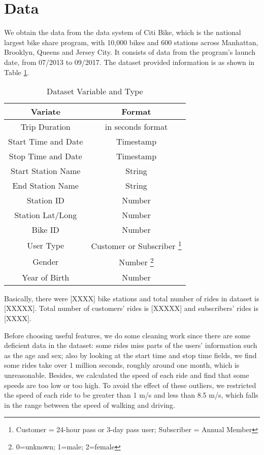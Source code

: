 \section{Data}
  \par We obtain the data from the data system of Citi Bike, which is the national largest bike share program, with 10,000 bikes and 600 stations across Manhattan, Brooklyn, Queens and Jersey City\cite{bike}. It consists of data from the program's launch date, from 07/2013 to 09/2017. The dataset provided information is as shown in Table \ref{tab_1}. 
	\begin{center}
	\begin{table}[h!]
	\begin{tabular}{ |c|c| } 
	 \hline
	 Variate & Format \\ 
	 \hline
	 Trip Duration & in seconds format \\ 
	 \hline
	 Start Time and Date & Timestamp\\ 
	 \hline
	 Stop Time and Date & Timestamp\\
	 \hline
	 Start Station Name & String\\
	 \hline
	 End Station Name & String\\
	 \hline
	 Station ID & Number\\
	 \hline
	 Station Lat/Long & Number\\
	 \hline
	 Bike ID & Number\\
	 \hline
	 User Type & Customer or Subscriber \footnote{Customer = 24-hour pass or 3-day pass user; Subscriber = Annual Member} \\
	 \hline
	 Gender & Number \footnote{0=unknown; 1=male; 2=female} \\
	 \hline
	 Year of Birth & Number\\
	 \hline
	\end{tabular}
	\caption{Dataset Variable and Type}
	\label{tab_1}
	\end{table}
	\end{center}
	Basically, there were [XXXX] bike stations and total number of rides in dataset is [XXXXX]. Total number of customers' rides is [XXXXX] and subscribers' rides is [XXXX].

Before choosing useful features, we do some cleaning work since there are some deficient data in the dataset: some rides miss parts of the users’ information such as the age and sex; also by looking at the start time and stop time fields, we find some rides take over 1 million seconds, roughly around one month, which is unreasonable. Besides, we calculated the speed of each ride and find that some speeds are too low or too high. To avoid the effect of these outliers, we restricted the speed of each ride to be greater than 1 m/s and less than 8.5 m/s, which falls in the range between the speed of walking and driving. 

